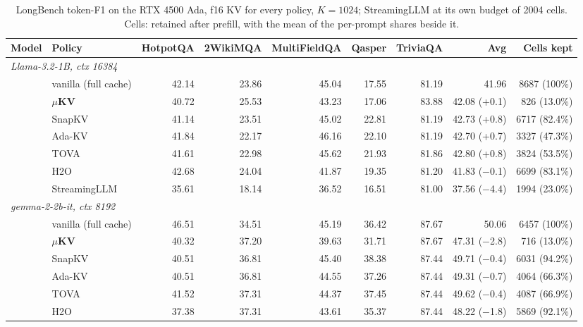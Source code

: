 \documentclass[sigconf, anonymous=false, screen=true]{acmart}
\newcommand{\muKV}{$\mu$KV}
\begin{document}
\begin{table}[tp]
\caption{LongBench token-F1 on the RTX 4500 Ada, f16 KV for every policy, $K{=}1024$; StreamingLLM at its own budget of 2004 cells. Cells: retained after prefill, with the mean of the per-prompt shares beside it.}
\label{tab:longbench}
\centering\small
\setlength{\tabcolsep}{5pt}
\begin{tabular}{l l r r r r r r r}
\toprule
\textbf{Model} & \textbf{Policy} & \textbf{HotpotQA} & \textbf{2WikiMQA} & \textbf{MultiFieldQA} & \textbf{Qasper} & \textbf{TriviaQA} & \textbf{Avg} & \textbf{Cells kept} \\
\midrule
\multicolumn{9}{l}{\emph{Llama-3.2-1B, ctx 16384}} \\
  & vanilla (full cache) & 42.14 & 23.86 & 45.04 & 17.55 & 81.19 & 41.96 & 8687 (100\%) \\
  & \textbf{\muKV}       & 40.72 & 25.53 & 43.23 & 17.06 & 83.88 & 42.08 (+0.1) & 826 (13.0\%) \\
  & SnapKV               & 41.14 & 23.51 & 45.02 & 22.81 & 81.19 & 42.73 (+0.8) & 6717 (82.4\%) \\
  & Ada-KV               & 41.84 & 22.17 & 46.16 & 22.10 & 81.19 & 42.70 (+0.7) & 3327 (47.3\%) \\
  & TOVA                 & 41.61 & 22.98 & 45.62 & 21.93 & 81.86 & 42.80 (+0.8) & 3824 (53.5\%) \\
  & H2O                  & 42.68 & 24.04 & 41.87 & 19.35 & 81.20 & 41.83 ($-$0.1) & 6699 (83.1\%) \\
  & StreamingLLM         & 35.61 & 18.14 & 36.52 & 16.51 & 81.00 & 37.56 ($-$4.4) & 1994 (23.0\%) \\
\midrule
\multicolumn{9}{l}{\emph{gemma-2-2b-it, ctx 8192}} \\
  & vanilla (full cache) & 46.51 & 34.51 & 45.19 & 36.42 & 87.67 & 50.06 & 6457 (100\%) \\
  & \textbf{\muKV}       & 40.32 & 37.20 & 39.63 & 31.71 & 87.67 & 47.31 ($-$2.8) & 716 (13.0\%) \\
  & SnapKV               & 40.51 & 36.81 & 45.40 & 38.38 & 87.44 & 49.71 ($-$0.4) & 6031 (94.2\%) \\
  & Ada-KV               & 40.51 & 36.81 & 44.55 & 37.26 & 87.44 & 49.31 ($-$0.7) & 4064 (66.3\%) \\
  & TOVA                 & 41.52 & 37.31 & 44.37 & 37.45 & 87.44 & 49.62 ($-$0.4) & 4087 (66.9\%) \\
  & H2O                  & 37.38 & 37.31 & 43.61 & 35.37 & 87.44 & 48.22 ($-$1.8) & 5869 (92.1\%) \\

\end{tabular}
\end{table}
\end{document}

